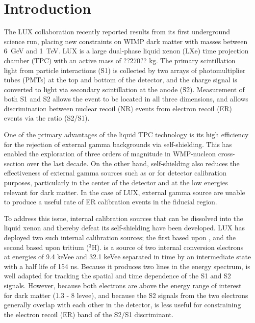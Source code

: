 \section{Introduction}

The LUX collaboration recently reported results from its first underground science run, placing new constraints on WIMP dark matter with masses between 6~GeV and 1~TeV\cite{lux_prl}. LUX is a large dual-phase liquid xenon (LXe) time projection chamber (TPC) with an active mass of ??270?? kg. The primary scintillation light from particle interactions (S1) is collected by two arrays of photomultiplier tubes (PMTs) at the top and bottom of the detector, and the charge signal is converted to light via secondary scintillation at the anode (S2). Measurement of both S1 and S2 allows the event to be located in all three dimensions, and allows discrimination between nuclear recoil (NR) events from electron recoil (ER) events via the ratio (S2/S1).

One of the primary advantages of the liquid TPC technology is its high efficiency for the rejection of external gamma backgrounds via self-shielding. This has enabled the exploration of three orders of magnitude in WMP-nucleon cross-section over the last decade. On the other hand, self-shielding also reduces the effectiveness of external gamma sources such as \cssrc or \thsrc for detector calibration purposes, particularly in the center of the detector and at the low energies relevant for dark matter. In the case of LUX, external gamma source are unable to produce a useful rate of ER calibration events in the fiducial region.  

To address this issue, internal calibration sources that can be dissolved into the liquid xenon and thereby defeat its self-shielding have been developed\cite{Kastens:2009rt}. LUX has deployed two such internal calibration sources; the first based upon \krsrc, and the second based upon tritium ($^{3}$H). \krsrc is a source of two internal conversion electrons at energies of 9.4 keVee and 32.1 keVee separated in time by an intermediate state with a half life of 154 ns. Because it produces two lines in the energy spectrum, \krsrc is well adapted for tracking the spatial and time dependence of the S1 and S2 signals. However, because both \krsrc electrons are above the energy range of interest for dark matter (1.3 - 8 levee), and because the S2 signals from the two electrons generally overlap with each other in the detector,  \krsrc is less useful for constraining the electron recoil (ER) band of the S2/S1 discriminant. 

